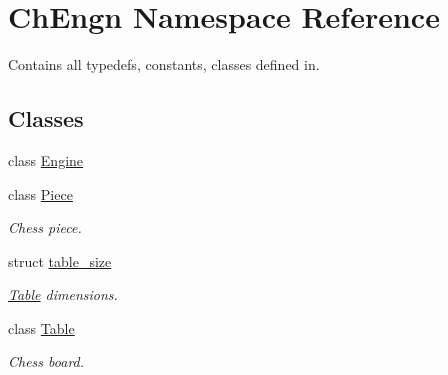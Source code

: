 \hypertarget{namespaceChEngn}{
\section{ChEngn Namespace Reference}
\label{namespaceChEngn}
}


Contains all typedefs, constants, classes defined in.  


\subsection*{Classes}
\begin{DoxyCompactItemize}
\item 
class \hyperlink{classChEngn_1_1Engine}{Engine}
\item 
class \hyperlink{classChEngn_1_1Piece}{Piece}
\begin{DoxyCompactList}\small\item\em Chess piece. \item\end{DoxyCompactList}\item 
struct \hyperlink{structChEngn_1_1table__size}{table\_\-size}
\begin{DoxyCompactList}\small\item\em \hyperlink{classChEngn_1_1Table}{Table} dimensions. \item\end{DoxyCompactList}\item 
class \hyperlink{classChEngn_1_1Table}{Table}
\begin{DoxyCompactList}\small\item\em Chess board. \item\end{DoxyCompactList}\end{DoxyCompactItemize}
